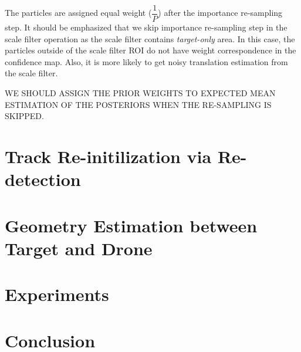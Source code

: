 \documentclass[10pt,twocolumn,letterpaper]{article}
\newcounter{ct}
\begin{document}
The particles are assigned equal weight ($\dfrac{1}{P}$) after the importance re-sampling step. It should be emphasized that we skip importance re-sampling step in the scale filter operation as the scale filter contains \textit{target-only} area. In this case, the particles outside of the scale filter ROI do not have weight correspondence in the confidence map. Also, it is more likely to get noisy translation estimation from the scale filter.

WE SHOULD ASSIGN THE PRIOR WEIGHTS TO EXPECTED MEAN ESTIMATION OF THE POSTERIORS WHEN THE RE-SAMPLING IS SKIPPED.
\section{Track Re-initilization via Re-detection}
\label{sc:Re-initialization}

\section{Geometry Estimation between Target and Drone}
\label{sc:Geometry}

\section{Experiments}
\label{sc:Experiments}

\section{Conclusion}
\label{sc:Conclusion}


\small


\end{document}
